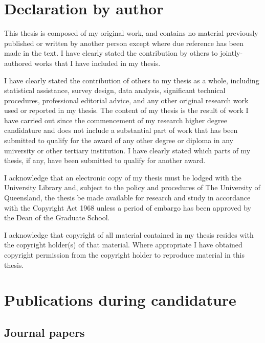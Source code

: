  

\clearpage
\section*{Declaration by author}

  This thesis is composed of my original work, and contains no material previously published or written by another person except where due reference has been made in the text. I have clearly stated the contribution by others to jointly-authored works that I have included in my thesis.

  I have clearly stated the contribution of others to my thesis as a whole, including statistical assistance, survey design, data analysis, significant technical procedures, professional editorial advice, and any other original research work used or reported in my thesis. The content of my thesis is the result of work I have carried out since the commencement of my research higher degree candidature and does not include a substantial part of work that has been submitted to qualify for the award of any other degree or diploma in any university or other tertiary institution. I have clearly stated which parts of my thesis, if any, have been submitted to qualify for another award.

  I acknowledge that an electronic copy of my thesis must be lodged with the University Library and, subject to the policy and procedures of The University of Queensland, the thesis be made available for research and study in accordance with the Copyright Act 1968 unless a period of embargo has been approved by the Dean of the Graduate School.

  I acknowledge that copyright of all material contained in my thesis resides with the copyright holder(s) of that material. Where appropriate I have obtained copyright permission from the copyright holder to reproduce material in this thesis.

\clearpage
\section*{Publications during candidature}

\subsection*{Journal papers}

\noindent{}\\


